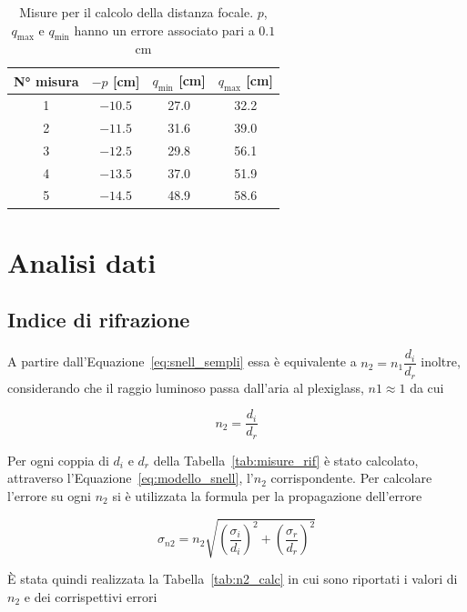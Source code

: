 \documentclass[a4paper,12pt]{article}
\begin{document}
\begin{table}[h!]
    \centering
    \begin{tabular}{c c c c}
        \toprule
        N° misura & $-p$ [cm] & $q_{\min}$ [cm] & $q_{\max}$ [cm] \\
        \midrule
        1 & $-10.5$ & 27.0 & 32.2 \\
        2 & $-11.5$ & 31.6 & 39.0 \\
        3 & $-12.5$ & 29.8 & 56.1 \\
        4 & $-13.5$ & 37.0 & 51.9 \\
        5 & $-14.5$ & 48.9 & 58.6 \\
        \bottomrule
    \end{tabular}
    \caption{Misure per il calcolo della distanza focale. $p$, $q_{\max}$ e $q_{\min}$ hanno un errore associato pari a $0.1$ cm}%
    \label{tab:misure_foc}
\end{table}

\section{Analisi dati}

\subsection{Indice di rifrazione}

A partire dall'Equazione~\ref{eq:snell_sempli} essa è equivalente a $n_2 = n_1 \dfrac{d_i}{d_r}$ inoltre, considerando che il raggio luminoso passa dall'aria al plexiglass, $n1 \approx 1$ da cui

\begin{equation}
    n_2 = \dfrac{d_i}{d_r}
    \label{eq:modello_snell}
\end{equation}

Per ogni coppia di $d_i$ e $d_r$ della Tabella~\ref{tab:misure_rif} è stato calcolato, attraverso l'Equazione~\ref{eq:modello_snell}, l'$n_2$ corrispondente. Per calcolare l'errore su ogni $n_2$ si è utilizzata la formula per la propagazione dell'errore

\[ \sigma_{n2} = n_2 \sqrt{{\left( \dfrac{\sigma_i}{d_i} \right)}^2 + {\left( \dfrac{\sigma_r}{d_r} \right)}^2 } \]

\`E stata quindi realizzata la Tabella~\ref{tab:n2_calc} in cui sono riportati i valori di $n_2$ e dei corrispettivi errori
\end{document}
